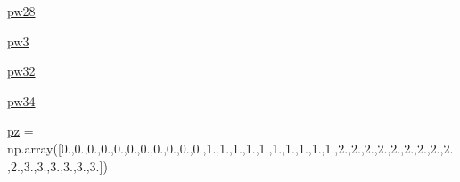 \begin{DoxyCompactItemize}
\mbox{\hyperlink{namespacewBDE_a8f86eb9ba19e66919b0727141cf4f01b}{pw28}}
\item 
\mbox{\hyperlink{namespacewBDE_a61a816ef4edab1168d773e576d5e1321}{pw3}}
\item 
\mbox{\hyperlink{namespacewBDE_aa2c7cf8e2b74816c2f92e4e4be25840c}{pw32}}
\item 
\mbox{\hyperlink{namespacewBDE_a66b08b6bf6c9b97a79c1948e00acbe10}{pw34}}
\item 
\mbox{\hyperlink{namespacewBDE_a0718e21a1de05ef96e74436fa9610ddf}{pz}} = np.\+array(\mbox{[}0.,0.,0.,0.,0.,0.,0.,0.,0.,0.,0.,1.,1.,1.,1.,1.,1.,1.,1.,1.,1.,2.,2.,2.,2.,2.,2.,2.,2.,2.,2.,3.,3.,3.,3.,3.,3.\mbox{]})
\item 

\end{DoxyCompactItemize}
